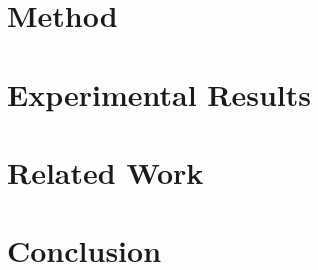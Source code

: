 \documentclass[acmlarge]{acmart}
\begin{document}



% 


% 

\section{Method} \label{sec:method}



\section{Experimental Results} \label{sec:results}



\vspace{3mm}
\section{Related Work} \label{sec:relatedWork}



\section{Conclusion} \label{sec:conclusion}
\end{document}
